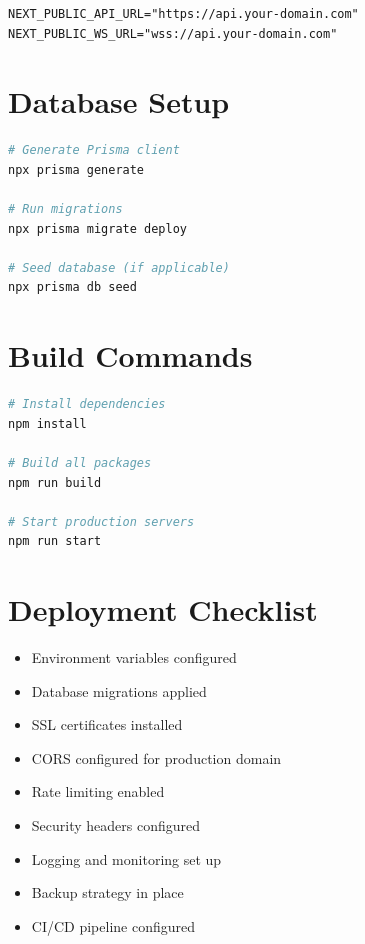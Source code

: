 \documentclass[12pt,a4paper]{report}
\begin{document}
\begin{lstlisting}[caption=Frontend Environment Variables]
NEXT_PUBLIC_API_URL="https://api.your-domain.com"
NEXT_PUBLIC_WS_URL="wss://api.your-domain.com"
\end{lstlisting}

\section{Database Setup}

\begin{lstlisting}[language=bash, caption=Database Migration Commands]
# Generate Prisma client
npx prisma generate

# Run migrations
npx prisma migrate deploy

# Seed database (if applicable)
npx prisma db seed
\end{lstlisting}

\section{Build Commands}

\begin{lstlisting}[language=bash, caption=Build Commands]
# Install dependencies
npm install

# Build all packages
npm run build

# Start production servers
npm run start
\end{lstlisting}

\section{Deployment Checklist}

\begin{itemize}
    \item[$\square$] Environment variables configured
    \item[$\square$] Database migrations applied
    \item[$\square$] SSL certificates installed
    \item[$\square$] CORS configured for production domain
    \item[$\square$] Rate limiting enabled
    \item[$\square$] Security headers configured
    \item[$\square$] Logging and monitoring set up
    \item[$\square$] Backup strategy in place
    \item[$\square$] CI/CD pipeline configured
\end{itemize}
\end{document}
